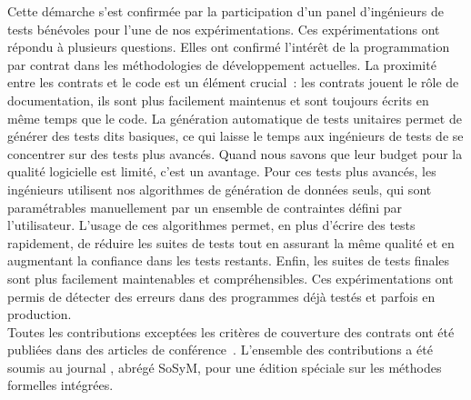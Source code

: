 Cette démarche s'est confirmée par la participation d'un panel d'ingénieurs de
tests bénévoles pour l'une de nos expérimentations. Ces expérimentations ont
répondu à plusieurs questions. Elles ont confirmé l'intérêt de la programmation
par contrat dans les méthodologies de développement actuelles. La proximité
entre les contrats et le code est un élément crucial~: les contrats jouent le
rôle de documentation, ils sont plus facilement maintenus et sont toujours
écrits en même temps que le code. La génération automatique de tests unitaires
permet de générer des tests dits basiques, ce qui laisse le temps aux ingénieurs
de tests de se concentrer sur des tests plus avancés. Quand nous savons que leur
budget pour la qualité logicielle est limité, c'est un avantage. Pour ces tests
plus avancés, les ingénieurs utilisent nos algorithmes de génération de données
seuls, qui sont paramétrables manuellement par un ensemble de contraintes défini
par l'utilisateur. L'usage de ces algorithmes permet, en plus d'écrire des tests
rapidement, de réduire les suites de tests tout en assurant la même qualité et
en augmentant la confiance dans les tests restants. Enfin, les suites de tests
finales sont plus facilement maintenables et compréhensibles. Ces
expérimentations ont permis de détecter des erreurs dans des programmes déjà
testés et parfois en production.  \\

Toutes les contributions exceptées les critères de couverture des contrats ont
été publiées dans des articles de conférence~. L'ensemble des contributions a été soumis au
journal , abrégé SoSyM, pour une
édition spéciale sur les méthodes formelles intégrées.

\section{}
\label{section:conclusions:summa}

